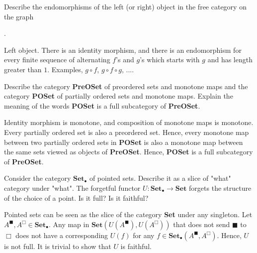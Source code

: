 \documentclass[11pt,a4paper]{article}
\begin{document}
\begin{exercise}
    Describe the endomorphisms of the left (or right) object in the free category on the graph .
\end{exercise}
\begin{solution}
    Left object. There is an identity morphism, and there is an endomorphism for every finite sequence of alternating $f$'s and $g$'s which starts with $g$ and has length greater than $1$. Examples, $g\circ f$, $g\circ f\circ g$, ....
\end{solution}

\begin{exercise}
    Describe the category \textbf{PreOSet} of preordered sets and monotone maps and the category \textbf{POSet} of partially ordered sets and monotone maps. Explain the meaning of the words \textbf{POSet} is a full subcategory of \textbf{PreOSet}.
\end{exercise}
\begin{solution}
    Identity morphism is monotone, and composition of monotone maps is monotone.
    Every partially ordered set is also a preordered set. Hence, every monotone map between two partially ordered sets in \textbf{POSet} is also a monotone map between the same sets viewed as objects of \textbf{PreOSet}. Hence, \textbf{POSet} is a full subcategory of \textbf{PreOSet}.
\end{solution}

\begin{exercise}
    Consider the category $\textbf{Set}_{\bullet}$ of pointed sets. Describe it as a slice of "what" category under "what". The forgetful functor $U: \textbf{Set}_{\bullet}\to \textbf{Set}$ forgets the structure of the choice of a point. Is it full? Is it faithful?
\end{exercise}
\begin{solution}
    Pointed sets can be seen as the slice of the category \textbf{Set} under any singleton. Let $A^{\blacksquare},A^{\Box}\in \textbf{Set}_{\bullet}$. Any map in $\textbf{Set}(U(A^{\blacksquare}), U(A^{\Box}))$ that does not send $\blacksquare$ to $\Box$ does not have a corresponding $U(f)$ for any $f\in \textbf{Set}_{\bullet}(A^{\blacksquare}, A^{\Box})$. Hence, $U$ is not full. It is trivial to show that $U$ is faithful.
\end{solution}
\end{document}

